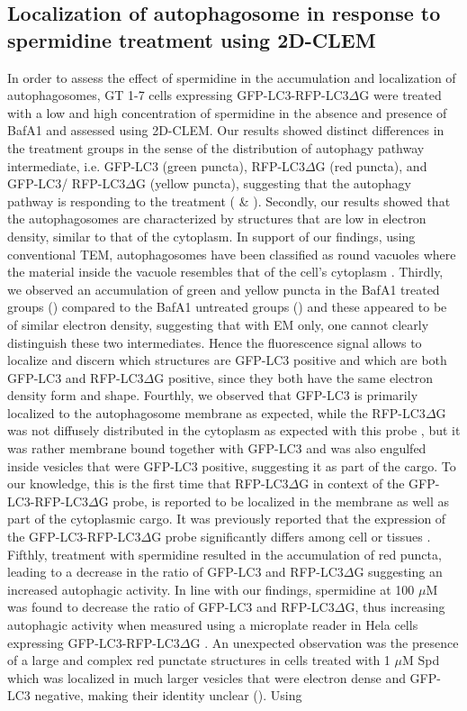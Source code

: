 \subsection{Localization of autophagosome in response to spermidine treatment using 2D-CLEM}
In order to assess the effect of spermidine in the accumulation and localization of  autophagosomes, GT 1-7 cells expressing GFP-LC3-RFP-LC3$\Delta$G were treated with a low and high concentration of spermidine in the absence and presence of BafA1 and assessed using 2D-CLEM. Our results showed distinct differences in the treatment groups in the sense of the distribution of autophagy pathway intermediate, i.e. GFP-LC3 (green puncta), RFP-LC3$\Delta$G (red puncta), and GFP-LC3/ RFP-LC3$\Delta$G (yellow puncta), suggesting that the autophagy pathway is responding to the treatment ( \& ). Secondly, our results showed that the autophagosomes are characterized by structures that are low in electron density, similar to that of the cytoplasm. In support of our findings, using conventional TEM, autophagosomes have been classified as round vacuoles where the material inside the vacuole resembles that of the cell’s cytoplasm \citep{Eskelinen2008}. Thirdly, we observed an accumulation of green and yellow puncta in the BafA1 treated groups () compared to the BafA1 untreated groups () and these appeared to be of similar electron density, suggesting that with EM only, one cannot clearly distinguish these two intermediates. Hence the fluorescence signal allows to localize and discern which structures are GFP-LC3 positive and which are both GFP-LC3 and RFP-LC3$\Delta$G positive, since they both have the same electron density form and shape. Fourthly, we observed that GFP-LC3 is primarily localized to the autophagosome membrane as expected, while the RFP-LC3$\Delta$G was not diffusely distributed in the cytoplasm as expected with this probe \citep{Kaizuka2016}, but it was rather membrane bound together with GFP-LC3 and was also engulfed inside vesicles that were GFP-LC3 positive, suggesting it as part of the cargo. To our knowledge, this is the first time that RFP-LC3$\Delta$G in context of the GFP-LC3-RFP-LC3$\Delta$G probe, is reported to be localized in the membrane as well as part of the cytoplasmic cargo. It was previously reported that the expression of the GFP-LC3-RFP-LC3$\Delta$G probe significantly differs among cell or tissues \citep{MoulisandVindis2017}. Fifthly, treatment with spermidine resulted in the accumulation of red puncta, leading to a decrease in the ratio of GFP-LC3 and RFP-LC3$\Delta$G suggesting an increased autophagic activity. In line with our findings, spermidine at 100 $\mu$M was found to decrease the ratio of GFP-LC3 and RFP-LC3$\Delta$G, thus increasing autophagic activity when measured using a microplate reader in Hela cells expressing GFP-LC3-RFP-LC3$\Delta$G \citep{Kaizuka2016}. An unexpected observation was the presence of a large and complex red punctate structures in cells treated with 1 $\mu$M Spd which was localized in much larger vesicles that were electron dense and GFP-LC3 negative, making their identity unclear (). Using 